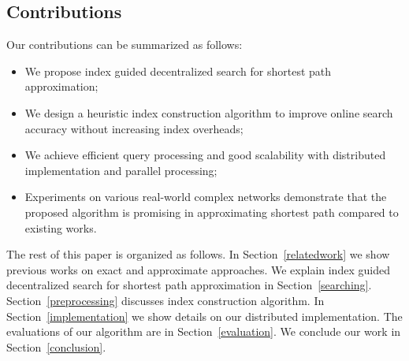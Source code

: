 \subsection{Contributions}
Our contributions can be summarized as follows:

\begin{itemize}
	\item We propose index guided decentralized search for shortest path approximation;
	\item We design a heuristic index construction algorithm to improve online search accuracy without increasing index overheads;
	\item We achieve efficient query processing and good scalability with distributed implementation and parallel processing;
	\item Experiments on various real-world complex networks demonstrate that the proposed algorithm is promising in approximating shortest path compared to existing works.
\end{itemize}

The rest of this paper is organized as follows. In Section~\ref{relatedwork} we show previous works on exact and approximate approaches. We explain index guided decentralized search for shortest path approximation in Section~\ref{searching}. Section~\ref{preprocessing} discusses index construction algorithm. In Section~\ref{implementation} we show details on our distributed implementation. The evaluations of our algorithm are in Section~\ref{evaluation}. We conclude our work in Section~\ref{conclusion}.
